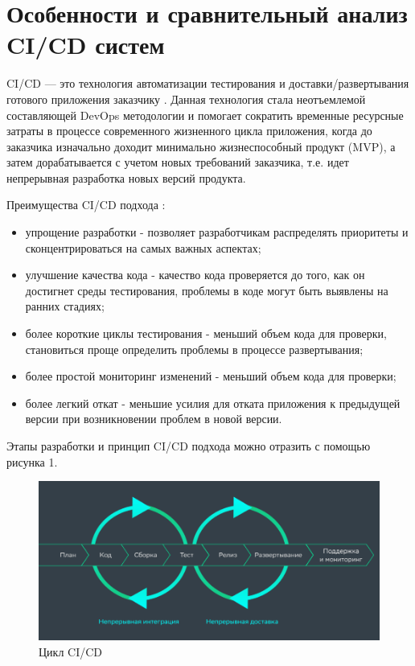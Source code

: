 \section{Особенности и сравнительный анализ CI/CD систем} \label{ch1:sec2}

CI/CD — это технология автоматизации тестирования и доставки/развертывания готового приложения заказчику  \cite{cicd}. Данная технология стала неотъемлемой составляющей DevOps методологии и помогает сократить временные  ресурсные затраты в процессе современного жизненного цикла приложения, когда до заказчика изначально доходит минимально жизнеспособный продукт (MVP), а затем дорабатывается с учетом новых требований заказчика, т.е. идет непрерывная разработка новых версий продукта.

Преимущества CI/CD подхода \cite{plusci}:

\begin{itemize}
	\item упрощение разработки - позволяет разработчикам распределять приоритеты и сконцентрироваться на самых важных аспектах;
	\item улучшение качества кода -  качество кода проверяется до того, как он достигнет среды тестирования, проблемы в коде могут быть выявлены на ранних стадиях;
	\item более короткие циклы тестирования - меньший объем кода для проверки, становиться проще определить проблемы в процессе развертывания;
	\item более простой мониторинг изменений - меньший объем кода для проверки;
	\item более легкий откат - меньшие усилия для отката приложения к предыдущей версии при возникновении проблем в новой версии.
\end{itemize}

Этапы разработки и принцип CI/CD подхода можно отразить с помощью рисунка 1.

\begin{figure}[ht!] 
	\center
	\includegraphics [scale=0.67] {my_folder/images//cicdalter}
	\caption{Цикл CI/CD \cite{cycleci}} 
	\label{fig:ci-cd}  
\end{figure}

